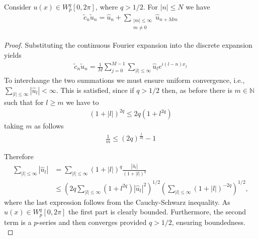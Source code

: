     \begin{lemma}
    \label{lemma_2.1}
    Consider $u(x) \in W^q_p [0, 2\pi]$, where $q > 1/2$. For $|n| \leq N$ we have
	    \begin{align}
	    \label{alias}   
	        \widetilde{c}_n \widetilde{u}_n = \displaystyle \hat{u}_n + \sum_{\substack{|m|\leq \infty \\ m \neq 0}} \hat{u}_{n + Mm}
	    \end{align}
	\end{lemma}
	\begin{proof}
    Substituting the continuous Fourier expansion into the discrete expansion yields
    \begin{align*}
        \widetilde{c}_n \widetilde{u}_n = \frac{1}{M} \displaystyle \sum_{j=0}^{M - 1} \sum_{|l| \leq \infty} \hat{u}_l e^{i(l -n)x_j}
    \end{align*}
    To interchange the two summations we must ensure uniform convergence, i.e., $\sum_{|l| \leq \infty} |\hat{u}_l| < \infty$. This is satisfied, since if $q> 1/2$ then, as before there is $m \in \mathbb{N}$ such that for $l \geq m$ we have to
    \begin{align*}
    	(1 + |l|)^{2q} \leq 2q(1 + l^{2q}) 
    \end{align*}
	taking $m$ as follows 
	\begin{align*}
		\frac{1}{m} \leq (2q)^{\frac{1}{2q}} - 1 
	\end{align*}

	\noindent Therefore
    \begin{align*}
        \displaystyle \sum_{|l| \leq \infty} |\hat{u}_l| &= \sum_{|l| \leq \infty} (1 + |l|)^q \frac{|\hat{u}_l|}{(1 + |l|)^q}  \\
        &\leq \left( 2q \sum_{|l| \leq \infty}  (1 + l^{2q}) |\hat{u}_l|^2 \right)^{1/2} \left(\sum_{|l| \leq \infty} (1 + |l|)^{-2q}  \right)^{1/2},
    \end{align*}
    where the last expression follows from the Cauchy-Schwarz inequality. As $u(x) \in W^q_p [0, 2\pi]$ the first part is clearly bounded. Furthermore, the second term is a $p$-series and then converges provided $q > 1/2$, ensuring boundedness. \\
    

\end{proof}
